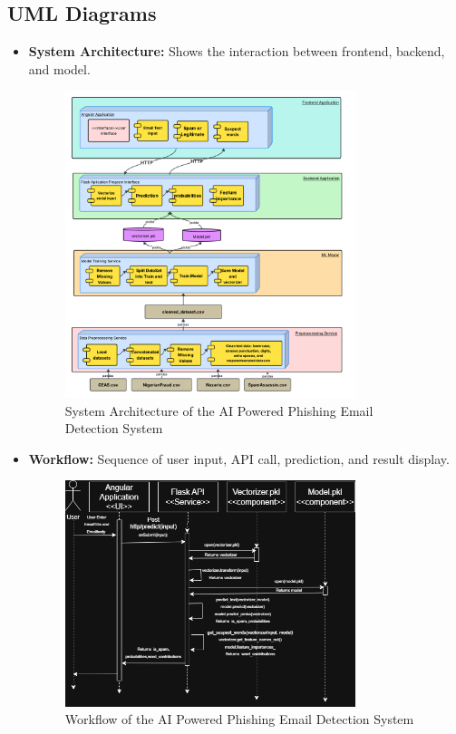 \documentclass{article}
\begin{document}
\subsection{UML Diagrams} 
\begin{itemize}
    \item \textbf{System Architecture:} Shows the interaction between frontend, backend, and model.
    \begin{figure}[h!]
        \centering
        \includegraphics[width=0.8\textwidth]{Architecture.png}
        \caption{System Architecture of the AI Powered Phishing Email Detection System}
        \label{fig:system-architecture}
    \end{figure}

    \newpage
    \item \textbf{Workflow:} Sequence of user input, API call, prediction, and result display.
    \begin{figure}[h!]
        \centering
        \includegraphics[width=0.8\textwidth]{Sequence.png}
        \caption{Workflow of the AI Powered Phishing Email Detection System}
        \label{fig:workflow}
    \end{figure}
    

\end{itemize}
\end{document}
